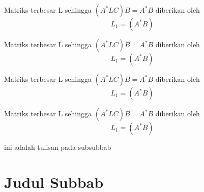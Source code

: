 \begin{teorema}
	Matriks terbesar L sehingga $(A^*LC) B = A^*B$ diberikan oleh
	\begin{equation}
		L_1=(A^* B)
	\end{equation}
\end{teorema}

\begin{teorema}
		Matriks terbesar L sehingga $(A^*LC) B = A^*B$ diberikan oleh
	\begin{equation}
		L_1=(A^* B)
	\end{equation}
\end{teorema}
\begin{teorema}
		Matriks terbesar L sehingga $(A^*LC) B = A^*B$ diberikan oleh
	\begin{equation}
		L_1=(A^* B)
	\end{equation}
\end{teorema}

\begin{bukti}
		Matriks terbesar L sehingga $(A^*LC) B = A^*B$ diberikan oleh
	\begin{equation}
		L_1=(A^* B)
	\end{equation}
\end{bukti}



ini adalah tulisan pada subsubbab


\section{Judul Subbab}